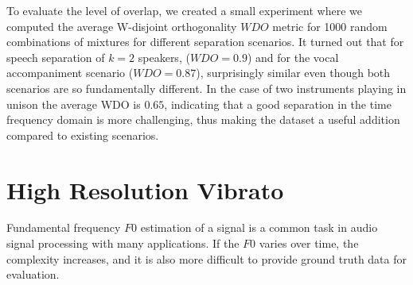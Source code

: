 To evaluate the level of overlap, we created a small experiment where we computed the average W-disjoint orthogonality \(WDO\) metric for 1000 random combinations of mixtures for different separation scenarios.
It turned out that for speech separation of \(k=2\) speakers, (\(WDO=0.9\)) and for the vocal accompaniment scenario (\(WDO=0.87\)), surprisingly similar even though both scenarios are so fundamentally different.
In the case of two instruments playing in unison the average WDO is \(0.65\), indicating that a good separation in the time frequency domain is more challenging, thus making the dataset a useful addition compared to existing scenarios.


\section{High Resolution Vibrato}


Fundamental frequency \(F0\) estimation of a signal is a common task in audio signal processing with many applications. 
If the $F0$ varies over time, the complexity increases, and it is also more difficult to provide ground truth data for evaluation.

